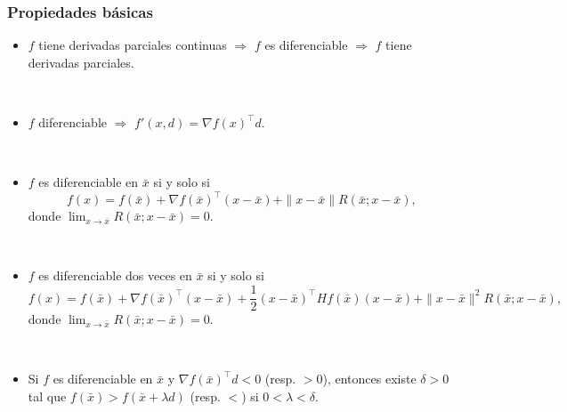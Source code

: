 \documentclass{beamer}
\begin{document}
\begin{frame}
\frametitle{Propiedades básicas}

{\scriptsize




\begin{itemize}
\item $f$ tiene derivadas parciales continuas $\Rightarrow$ $f$ es diferenciable $\Rightarrow$ $f$ tiene derivadas parciales.

\

\item $f$ diferenciable $\Rightarrow$ $f'(x,d)=\nabla f(x)^\top d$.

\

\item  $f$ es diferenciable en $\bar{x}$ si y solo si
\[
f(x) = f(\bar{x}) +  \nabla f(\bar{x})^\top (x-\bar{x}) + \|x-\bar{x}\| R(\bar{x};x-\bar{x}),
\]
donde $\lim_{x\to\bar{x}} R(\bar{x};x-\bar{x})=0$.

\

\item  $f$ es diferenciable dos veces en $\bar{x}$ si y solo si
\[
f(x) = f(\bar{x}) +  \nabla f(\bar{x})^\top (x-\bar{x}) + 
\frac{1}{2} (x-\bar{x})^\top Hf(\bar{x}) (x-\bar{x}) +   \|x-\bar{x}\|^2 R(\bar{x};x-\bar{x}),
\]
donde $\lim_{x\to\bar{x}} R(\bar{x};x-\bar{x})=0$.


\


\item  Si $f$ es diferenciable en $\bar{x}$ y $\nabla f(\bar{x})^\top d < 0$ (resp. $>0$), entonces existe $\delta>0$ tal que $f(\bar{x})>f(\bar{x}+\lambda d)$ (resp. $<$) si $0<\lambda <\delta$.

\end{itemize}
}


\end{frame}
\end{document}
